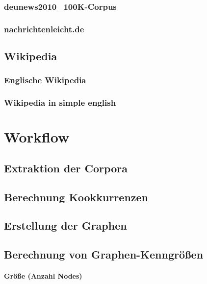 \documentclass[12pt]{article}
\begin{document}
\subsubsection{deunews2010\_100K-Corpus}

\subsubsection{nachrichtenleicht.de}


\subsection{Wikipedia}

\subsubsection{Englische Wikipedia}

\subsubsection{Wikipedia in simple english}



\section{Workflow}

\subsection{Extraktion der Corpora}


\subsection{Berechnung Kookkurrenzen}


\subsection{Erstellung der Graphen}


\subsection{Berechnung von Graphen-Kenngr\"o\ss{}en}


\paragraph{Gr\"o\ss{}e (Anzahl Nodes)}
\end{document}
